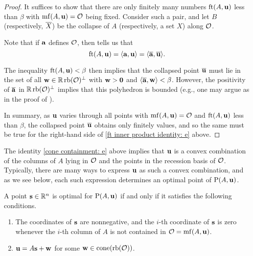 \documentclass[11pt]{amsart}
\begin{document}
\begin{proof}   
It suffices to show that there are only finitely many numbers $\operatorname{ft}(A, \mathbf{u})$ less than $\beta$ with $\operatorname{mf}(A, \mathbf{u}) = \mathcal{O}$ being fixed.   Consider such a pair, and let $B$ (respectively, $\overline{X}$) be the collapse of $A$ (respectively,  a set $X$) along $\mathcal{O}$.

Note that if $\mathbf{a}$ defines $\mathcal{O}$, then  tells us that 
%
\begin{equation} 
\label{ft inner product identity: e}
\operatorname{ft}(A, \mathbf{u}) = \langle \mathbf{a}, \mathbf{u} \rangle = \langle \overline{\mathbf{a}}, \overline{\mathbf{u}} \rangle. 
\end{equation}
% 

The inequality $\operatorname{ft}(A, \mathbf{u}) < \beta$ then implies that the collapsed point $\overline{\mathbf{u}}$ must lie in the set of all $\mathbf{w} \in \mathbb{R} \operatorname{rb}(\mathcal{O})^{\perp}$ with $\mathbf{w} > \mathbf{0}$ and $\langle \overline{\mathbf{a}}, \mathbf{w} \rangle < \beta$.  However, the positivity of $\overline{\mathbf{a}}$ in $\mathbb{R} \operatorname{rb}(\mathcal{O})^{\perp}$ implies that this polyhedron is bounded (e.g., one may argue as in the proof of ).  

In summary, as $\mathbf{u}$ varies through all points with  $\operatorname{mf}(A, \mathbf{u}) = \mathcal{O}$ and $\operatorname{ft}(A, \mathbf{u})$ less than $\beta$, the collapsed point $\overline{\mathbf{u}}$ obtains only finitely values, and so the same must be true for the right-hand side of \eqref{ft inner product identity: e} above.
\end{proof}


The identity \eqref{cone containment: e} above implies that 
$\mathbf{u}$ is a convex combination of the columns of $A$ lying in $\mathcal{O}$ and the points in the recession basis of $\mathcal{O}$.  Typically, there are many ways to express $\mathbf{u}$ as such a convex combination, and as we see below, each such expression determines an optimal point of $\mathrm{P}(A, \mathbf{u})$.

\begin{corollary}  
\label{opt set: C}
A point $\mathbf{s} \in \mathbb{R}^n$ is optimal for $\mathrm{P}(A, \mathbf{u})$ if and only if it satisfies the following conditions.
\begin{enumerate}
\item  \label{mc coords: e} The coordinates of $\mathbf{s}$ are nonnegative, and the $i$-th coordinate of $\mathbf{s}$ is zero whenever the $i$-th column of $A$ is not contained in $\mathcal{O} = \operatorname{mf}(A, \mathbf{u})$.
\item  \label{mc decomposition: e} $\mathbf{u} = A \mathbf{s} + \mathbf{w}$ for some $\mathbf{w} \in  \operatorname{cone}(\operatorname{rb}(\mathcal{O}))$.   
\end{enumerate}
\end{corollary}
\end{document}
